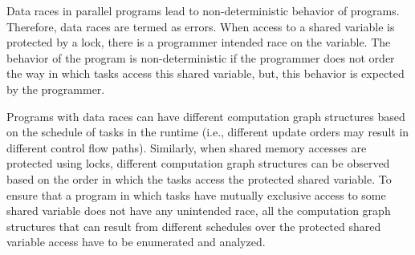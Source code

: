 Data races in parallel programs lead to non-deterministic behavior of programs. Therefore, data races are termed as errors. When access to a shared variable is protected by a lock, there is a programmer intended race on the variable. The behavior of the program is non-deterministic if the programmer does not order the way in which tasks access this shared variable, but, this behavior is expected by the programmer. 

Programs with data races can have different computation graph structures based on the schedule of tasks in the runtime (i.e., different update orders may result in different control flow paths). Similarly, when shared memory accesses are protected using locks, different computation graph structures can be observed based on the order in which the tasks access the protected shared variable. To ensure that a program in which tasks have mutually exclusive access to some shared variable does not have any unintended race, all the computation graph structures that can result from different schedules over the protected shared variable access have to be enumerated and analyzed.

